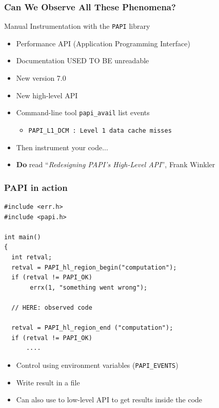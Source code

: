 \documentclass[xcolor={x11names,svgnames}]{beamer}
\begin{document}

\begin{frame}
  \frametitle{Can We Observe All These Phenomena?}


  \begin{alertblock}{Manual Instrumentation with the \texttt{PAPI} library}
    \begin{itemize}
    \item Performance API (Application Programming Interface)
    \item Documentation USED TO BE unreadable
    \item New version 7.0
    \item New high-level API
    \item Command-line tool \texttt{papi\_avail} list events
      \begin{itemize}
      \item \texttt{PAPI\_L1\_DCM  : Level 1 data cache misses}
      \end{itemize}
    \item Then instrument your code...
    \item \textbf{Do} read ``\textit{Redesigning PAPI’s High-Level API}'', Frank Winkler
    \end{itemize}
  \end{alertblock}
\end{frame}



\begin{frame}[fragile=singleslide]
  \frametitle{PAPI in action}
  
\begin{verbatim}
#include <err.h>
#include <papi.h>
  
int main()
{
  int retval;
  retval = PAPI_hl_region_begin("computation");
  if (retval != PAPI_OK)
       errx(1, "something went wrong");

  // HERE: observed code 

  retval = PAPI_hl_region_end ("computation");
  if (retval != PAPI_OK)
      ....
\end{verbatim}

\begin{itemize}
\item Control using environment variables (\texttt{PAPI\_EVENTS})
\item Write result in a file
\item Can also use to low-level API to get results inside the code
\end{itemize}


\end{frame}
  
\end{document}
